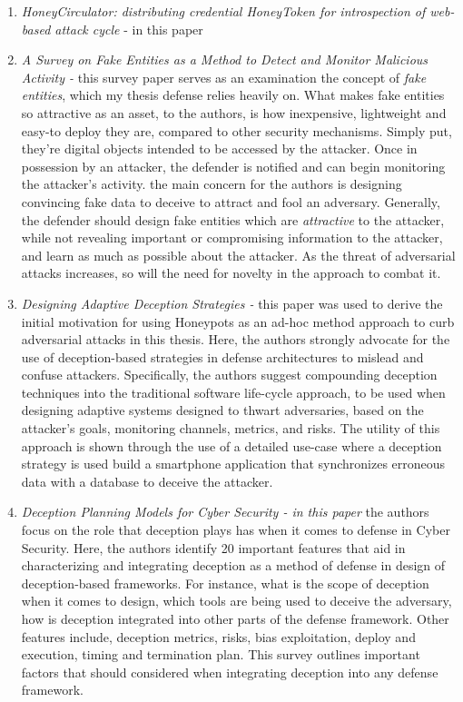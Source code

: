 \documentclass[grad,lot,lof,11pt,oneside,onehalfspace]{RUthesis}
\begin{document}
\begin{enumerate}
	\item \textit{HoneyCirculator: distributing credential HoneyToken for introspection of web-based attack cycle} -  in this paper \cite{akiyama_honeycirculator:_2017}
	\item \textit{A Survey on Fake Entities as a Method to Detect and Monitor Malicious Activity - } this survey paper \cite{rauti_survey_2017} serves as an examination the concept of \textit{fake entities}, which my thesis defense relies heavily on. What makes fake entities so attractive as an asset, to the authors, is how inexpensive, lightweight and easy-to deploy they are, compared to other security mechanisms. Simply put, they're digital objects intended to be accessed by the attacker. Once in possession by an attacker, the defender is notified and can begin monitoring the attacker's activity. the main concern for the authors is designing convincing fake data to deceive to attract and fool an adversary. Generally, the defender should design fake entities which are \textit{attractive} to the attacker, while not revealing important or compromising information to the attacker, and learn as much as possible about the attacker. As the threat of adversarial attacks increases, so will the need for novelty in the approach to combat it.
	\item \textit{Designing Adaptive Deception Strategies - } this paper \cite{faveri_designing_2016} was used to derive the initial motivation for using Honeypots as an ad-hoc method approach to curb adversarial attacks in this thesis. Here, the authors strongly advocate for the use of deception-based strategies in defense architectures to mislead and confuse attackers. Specifically, the authors suggest compounding deception techniques into the traditional software life-cycle approach, to be used when designing adaptive systems designed to thwart adversaries, based on the attacker's goals, monitoring channels, metrics, and risks. The utility of this approach is shown through the use of a detailed use-case where a deception strategy is used build a smartphone application that synchronizes erroneous data with a database to deceive the attacker. 
    \item \textit{Deception Planning Models for Cyber Security - in this paper} the authors focus on the role that deception plays has when it comes to defense in Cyber Security. Here, the authors identify 20 important features that aid in characterizing and integrating deception as a method of defense in design of deception-based frameworks. For instance, what is the scope of deception when it comes to design, which tools are being used to deceive the adversary, how is deception integrated into other parts of the defense framework. Other features include, deception metrics, risks, bias exploitation, deploy and execution, timing and termination plan. This survey outlines important factors that should considered when integrating deception into any defense framework. \\

\end{enumerate}
\end{document}
